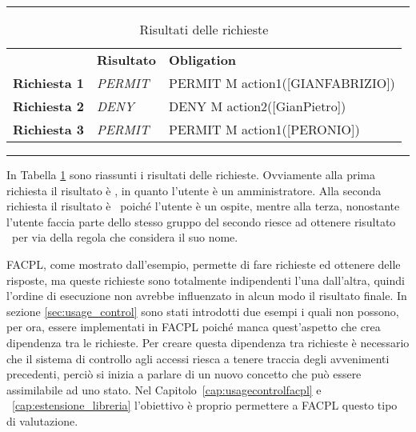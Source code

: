 \begin{table}[H]
\centering
\caption{Risultati delle richieste}
\label{tab:risultati_richieste}
\hrule
\begin{tabular}{lll}
 & \textbf{Risultato} & \textbf{Obligation} \\
\textbf{Richiesta 1} & \textit{PERMIT} & PERMIT M action1({[}GIANFABRIZIO{]}) \\
\textbf{Richiesta 2} & \textit{DENY} & DENY M action2({[}GianPietro{]}) \\
\textbf{Richiesta 3} & \textit{PERMIT} & PERMIT M action1({[}PERONIO{]})
\end{tabular}
\hrule
\end{table}
In Tabella \ref{tab:risultati_richieste} sono riassunti i risultati delle richieste. Ovviamente alla prima richiesta il risultato è \permit, in quanto l'utente è un amministratore. Alla seconda richiesta il risultato è \deny \ poiché l'utente è un ospite, mentre alla terza, nonostante l'utente faccia parte dello stesso gruppo del secondo riesce ad ottenere risultato \permit \ per via della regola che considera il suo nome. \par
\ac{FACPL}, come mostrato dall'esempio, permette di fare richieste ed ottenere delle risposte, ma queste richieste sono totalmente indipendenti l'una dall'altra, quindi l'ordine di esecuzione non avrebbe influenzato in alcun modo il risultato finale.
In sezione \ref{sec:usage_control} sono stati introdotti due esempi i quali non possono, per ora, essere implementati in FACPL poiché manca quest'aspetto che crea dipendenza tra le richieste.
Per creare questa dipendenza tra richieste è necessario che il sistema di controllo agli accessi riesca a tenere traccia degli avvenimenti precedenti, perciò si inizia a parlare di un nuovo concetto che può essere assimilabile ad uno stato. Nel Capitolo~\ref{cap:usagecontrolfacpl} e ~\ref{cap:estensione_libreria} l'obiettivo è proprio permettere a \ac{FACPL} questo tipo di valutazione.


